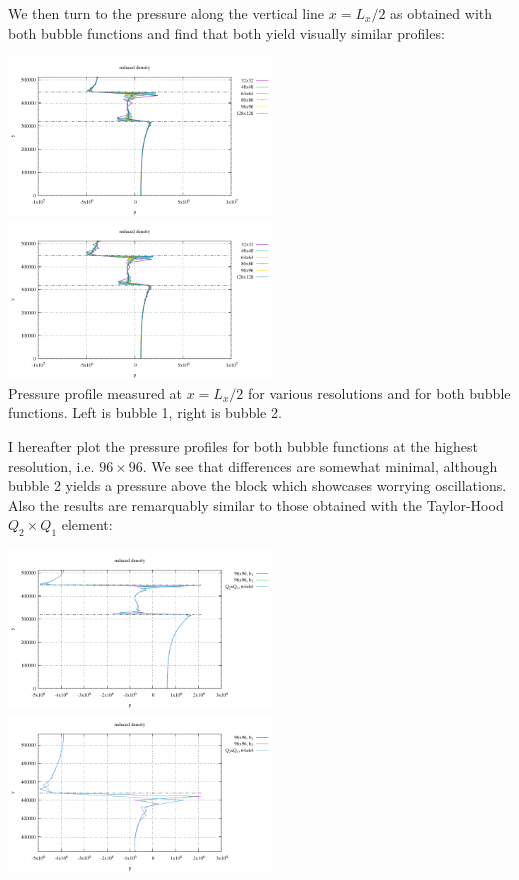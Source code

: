 We then turn to the pressure along the vertical line $x=L_x/2$ as obtained with 
both bubble functions and find that both yield visually similar profiles:

\begin{center}
\includegraphics[width=7cm]{python_codes/fieldstone_72/results/block/reduced/plines_b1}
\includegraphics[width=7cm]{python_codes/fieldstone_72/results/block/reduced/plines_b2}\\
{\captionfont Pressure profile measured at $x=L_x/2$ for various resolutions and for both bubble functions.
Left is bubble 1, right is bubble 2.}
\end{center}

I hereafter plot the pressure profiles for both bubble functions at the highest resolution, i.e. $96\times 96$.
We see that differences are somewhat minimal, although bubble 2 yields a pressure above the block which 
showcases worrying oscillations. Also the results are remarquably similar to those obtained with the Taylor-Hood
$Q_2\times Q_1$ element:

\begin{center}
\includegraphics[width=7cm]{python_codes/fieldstone_72/results/block/reduced/plines_b12}
\includegraphics[width=7cm]{python_codes/fieldstone_72/results/block/reduced/plines_b12_zoom}
\end{center}

